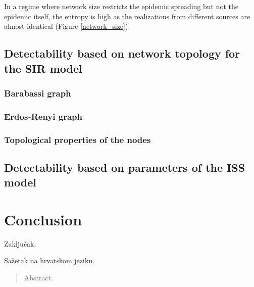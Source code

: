 \documentclass[times, utf8, diplomski]{fer}
\begin{document}
In a regime where network size restricts the epidemic spreading but not the epidemic itself, the entropy is high as the realizations from different sources are almost identical (Figure \ref{network_size}).


\section{Detectability based on network topology for the SIR model}
\subsection{Barabassi graph}
\subsection{Erdos-Renyi graph}
\subsection{Topological properties of the nodes}

\section{Detectability based on parameters of the ISS model}


\chapter{Conclusion}
Zaključak.


%


\begin{sazetak}
Sažetak na hrvatskom jeziku.

\end{sazetak}

\begin{abstract}
Abstract.

\end{abstract}
\end{document}
